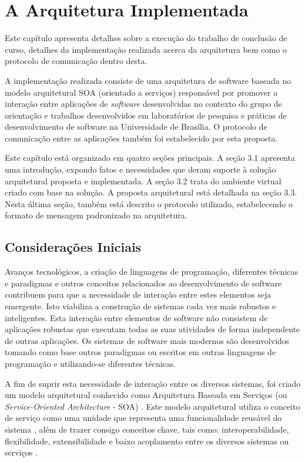 \chapter[A Arquitetura Implementada]{A Arquitetura Implementada}

Este capítulo apresenta detalhes sobre a execução do trabalho de conclusão de curso, detalhes da implementação realizada acerca da arquitetura bem como o protocolo de comunicação dentro desta.

A implementação realizada consiste de uma arquitetura de software baseada no modelo arquitetural SOA (orientado a serviços) responsável por promover a interação entre aplicações de \textit{software} desenvolvidas no contexto do grupo de orientação e trabalhos desenvolvidos em laboratórios de pesquisa e práticas de desenvolvimento de software na Universidade de Brasília. O protocolo de comunicação entre as aplicações também foi estabelecido por esta proposta.

Este capítulo está organizado em quatro seções principais. A seção 3.1 apresenta uma introdução, expondo fatos e necessidades que deram suporte à solução arquitetural proposta e implementada. A seção 3.2 trata do ambiente virtual criado com base na solução. A proposta arquitetural está detalhada na seção 3.3. Nesta última seção, também está descrito o protocolo utilizado, estabelecendo o formato de mensagem padronizado na arquitetura.

\section{Considerações Iniciais}
Avanços tecnológicos, a criação de linguagens de programação, diferentes técnicas e paradigmas e outros conceitos relacionados ao desenvolvimento de software contribuem para que a necessidade de interação entre estes elementos seja emergente. Isto viabiliza a construção de sistemas cada vez mais robustos e inteligentes. Esta interação entre elementos de software não consistem de aplicações robustas que executam todas as suas atividades de forma independente de outras aplicações. Os sistemas de software mais modernos são desenvolvidos tomando como base outros paradigmas ou escritos em outras linguagens de programação e utilizando-se diferentes técnicas.

A fim de suprir esta necessidade de interação entre os diversos sistemas, foi criado um modelo arquitetural conhecido como Arquitetura Baseada em Serviços (ou \textit{Service-Oriented Architecture} - SOA) \cite{linthicum_soainrealworld_2007}. Este modelo arquitetural utiliza o conceito de serviço como uma unidade que representa uma funcionalidade reusável do sistema \cite{lewis_getting_2010}, além de trazer consigo conceitos chave, tais como: interoperabilidade, flexibilidade, extensibilidade e baixo acoplamento entre os diversos sistemas ou serviços \cite{josuttis_soa_2007}.

